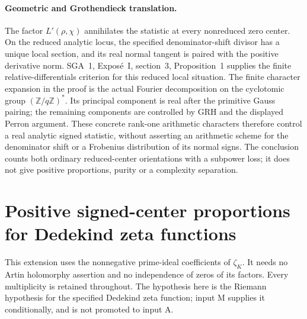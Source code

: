 \paragraph{Geometric and Grothendieck translation.}
The factor \(L'(\rho,\chi)\) annihilates the statistic at
every nonreduced zero center. On the reduced analytic locus,
the specified denominator-shift divisor has a unique local
section, and its real normal tangent is paired with the
positive derivative norm. SGA~1, Expos\'e~I, section~3,
Proposition~1 supplies the finite relative-differentials
criterion for this reduced local situation.
The finite character expansion in the proof is the actual
Fourier decomposition on the cyclotomic group
\((\mathbb Z/q\mathbb Z)^*\). Its principal component is
real after the primitive Gauss pairing; the remaining
components are controlled by GRH and the displayed Perron
argument. These concrete rank-one arithmetic characters
therefore control a real analytic signed statistic, without
asserting an arithmetic scheme for the denominator shift
or a Frobenius distribution of its normal signs.
The conclusion counts both ordinary reduced-center
orientations with a subpower loss; it does not give
positive proportions, purity or a complexity separation.


\section{Positive signed-center proportions for Dedekind zeta functions}
\label{sec:A043-dedekind-density}

This extension uses the nonnegative prime-ideal coefficients of
$\zeta_K$. It needs no Artin holomorphy assertion and no
independence of zeros of its factors. Every multiplicity is
retained throughout. The hypothesis here is the Riemann
hypothesis for the specified Dedekind zeta function; input M
supplies it conditionally, and is not promoted to input A.


